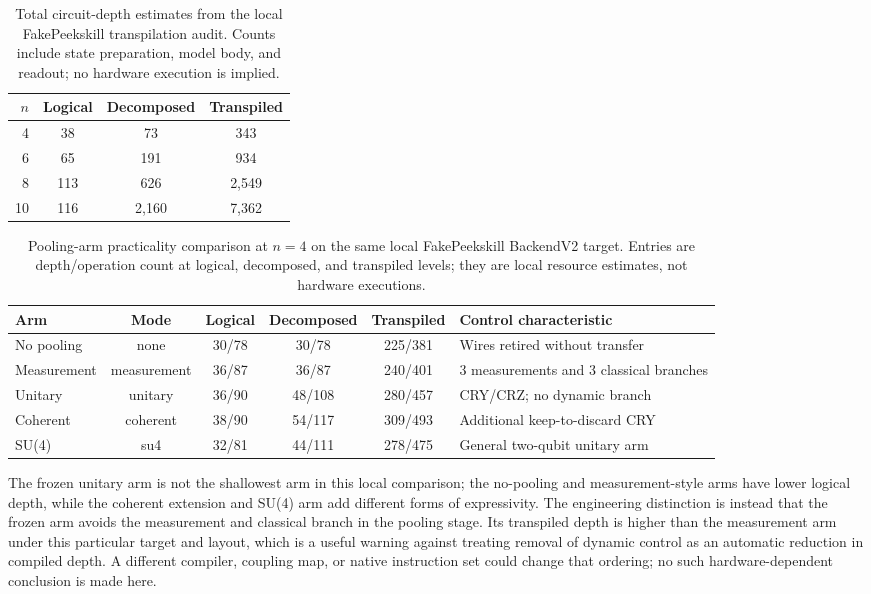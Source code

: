 \documentclass[conference]{IEEEtran}
\begin{document}
\begin{table}[!t]
\caption{Total circuit-depth estimates from the local FakePeekskill transpilation audit. Counts include state preparation, model body, and readout; no hardware execution is implied.}
\label{tab:resources}
\centering
\begin{tabular}{@{}rccc@{}}
\toprule
\textbf{$n$} & \textbf{Logical} & \textbf{Decomposed} & \textbf{Transpiled} \\
\midrule
4 & 38 & 73 & 343 \\
6 & 65 & 191 & 934 \\
8 & 113 & 626 & 2,549 \\
10 & 116 & 2,160 & 7,362 \\
\bottomrule
\end{tabular}
\end{table}

\begin{table}[!t]
\caption{Pooling-arm practicality comparison at $n=4$ on the same local FakePeekskill BackendV2 target. Entries are depth/operation count at logical, decomposed, and transpiled levels; they are local resource estimates, not hardware executions.}
\label{tab:pooling-resources}
\centering
\small
\begin{tabular}{@{}lccccl@{}}
\toprule
\textbf{Arm} & \textbf{Mode} & \textbf{Logical} & \textbf{Decomposed} & \textbf{Transpiled} & \textbf{Control characteristic} \\
\midrule
No pooling & none & 30/78 & 30/78 & 225/381 & Wires retired without transfer \\
Measurement & measurement & 36/87 & 36/87 & 240/401 & 3 measurements and 3 classical branches \\
Unitary & unitary & 36/90 & 48/108 & 280/457 & CRY/CRZ; no dynamic branch \\
Coherent & coherent & 38/90 & 54/117 & 309/493 & Additional keep-to-discard CRY \\
SU(4) & su4 & 32/81 & 44/111 & 278/475 & General two-qubit unitary arm \\
\bottomrule
\end{tabular}
\end{table}

The frozen unitary arm is not the shallowest arm in this local comparison; the
no-pooling and measurement-style arms have lower logical depth, while the
coherent extension and SU(4) arm add different forms of expressivity. The
engineering distinction is instead that the frozen arm avoids the measurement
and classical branch in the pooling stage. Its transpiled depth is higher than
the measurement arm under this particular target and layout, which is a useful
warning against treating removal of dynamic control as an automatic reduction
in compiled depth. A different compiler, coupling map, or native instruction
set could change that ordering; no such hardware-dependent conclusion is made
here.
\end{document}
